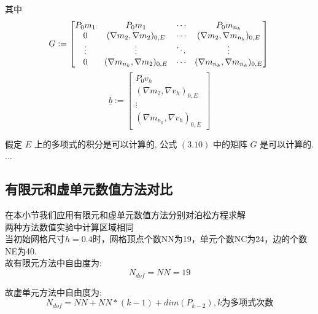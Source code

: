 \documentclass[12pt]{article}
\begin{document}
\begin{CJK}{UTF8}{gkai}
    其中 \\
    \begin{equation}
    G := \begin{bmatrix}
    P_0m_1 & P_0m_1 &\cdots&P_0m_{n_k} \\
    0 & (\nabla m_2,\nabla m_2)_{0,E} & \cdots & (\nabla m_2,\nabla m_{n_k})_{0,E} \\
    \vdots & \vdots & \ddots & \vdots\\
    0& (\nabla m_{n_k},\nabla m_2)_{0,E} & \cdots & (\nabla m_{n_k},\nabla m_{n_k})_{0,E}
    \end{bmatrix}\\
    \end{equation}
    \begin{equation}
    \underline b := \begin{bmatrix}
    P_0v_h\\
    (\nabla m_2,\nabla v_h)_{0,E} \\
    \vdots\\
    (\nabla m_{n_k},\nabla v_h)_{0,E} 
    \end{bmatrix}
    \end{equation}
    
    假定 $E$ 上的多项式的积分是可以计算的, 公式 $(3.10)$ 中的矩阵 $G$ 是可以计算的. \\

...\\

    \subsection{有限元和虚单元数值方法对比}
            
       在本小节我们应用有限元和虚单元数值方法分别对泊松方程求解\\
       
       两种方法数值实验中计算区域相同\\
       
       当初始网格尺寸$h=0.4$时，网格顶点个数NN为19，单元个数NC为24，边的个数NE为40.\\
       
       故有限元方法中自由度为:\\
        \begin{equation}
        N_{dof}=NN=19
        \end{equation}
        
         故虚单元方法中自由度为:\\
         \begin{equation}
         N_{dof}=NN+NN*(k-1)+dim(P_{k-2}) , k\text{为多项式次数}      
         \end{equation}
         

\end{CJK}
\end{document}
